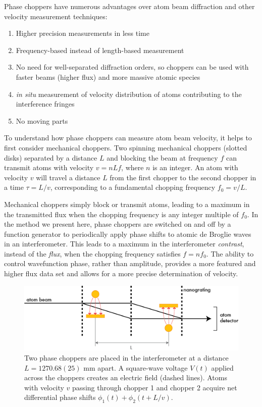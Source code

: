 Phase choppers have numerous advantages over atom beam diffraction and other velocity measurement techniques:
\begin{enumerate}
\item Higher precision measurements in less time
\item Frequency-based instead of length-based measurement
\item No need for well-separated diffraction orders, so choppers can be used with faster beams (higher flux) and more massive atomic species
\item \emph{in situ} measurement of velocity distribution of atoms contributing to the interference fringes
\item No moving parts
\end{enumerate}

To understand how phase choppers can measure atom beam velocity, it helps to first consider mechanical choppers. Two spinning mechanical choppers (slotted disks) separated by a distance $L$ and blocking the beam at frequency $f$ can transmit atoms with velocity $v = nLf$, where $n$ is an integer. An atom with velocity $v$ will travel a distance $L$ from the first chopper to the second chopper in a time $\tau=L/v$, corresponding to a fundamental chopping frequency $f_0=v/L$. 

Mechanical choppers simply block or transmit atoms, leading to a maximum in the transmitted flux when the chopping frequency is any integer multiple of $f_0$. In the method we present here, phase choppers are switched on and off by a function generator to periodically apply phase shifts to atomic de Broglie waves in an interferometer. This leads to a maximum in the interferometer \emph{contrast}, instead of the \emph{flux}, when the chopping frequency satisfies $f=n f_0$. The ability to control wavefunction phase, rather than amplitude, provides a more featured and higher flux data set and allows for a more precise determination of velocity. 


\begin{figure}
\includegraphics[width=1\textwidth]{Figures/IFMwithChoppers.png}
\caption[Phase choppers in the atom interferometer.]{\label{choppersIFMsimple}Two phase choppers are placed in the interferometer at a distance $L = 1270.68(25)$ mm apart. A square-wave voltage $V(t)$ applied across the choppers creates an electric field (dashed lines). Atoms with velocity $v$ passing through chopper 1 and chopper 2 acquire net differential phase shifts $\phi_1(t)+\phi_2(t+L/v)$.}
\end{figure}


